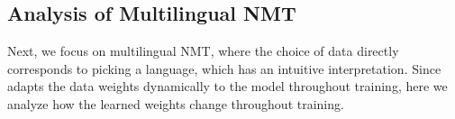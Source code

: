 \subsection{Analysis of Multilingual NMT}
Next, we focus on multilingual NMT, where the choice of data directly corresponds to picking a language, which has an intuitive interpretation. Since \dds adapts the data weights dynamically to the model throughout training, here we analyze how the learned weights change throughout training.

